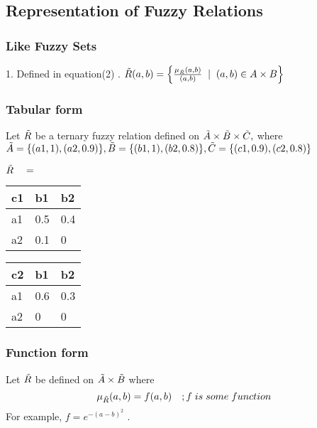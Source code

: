 \documentclass{article}
\begin{document}
\subsection{Representation of Fuzzy Relations}
\subsubsection{Like Fuzzy Sets}
1. Defined in equation(2) \newline{}. $\Tilde{R}(a,b)=\Bigl\{ \frac{\mu_{\Tilde{R}}(a,b)}{(a,b)}\hspace{0.1cm}\mid\hspace{0.1cm} (a,b)\in A\times B \Bigl\}$
\subsubsection{Tabular form}
Let $\Tilde{R}$ be a ternary fuzzy relation defined on $\Tilde{A}\times\Tilde{B}\times\Tilde{C},$ where $\Tilde{A}=\{(a1,1),(a2,0.9)\} , \Tilde{B}=\{(b1,1),(b2,0.8)\},\Tilde{C}=\{(c1,0.9),(c2,0.8)\} $
\begin{center}
$\Tilde{R}\quad = \quad$
\begin{tabular}{ | m{1cm} | m{1cm}| m{1cm} | } 
  \hline
  c1& b1 & b2 \\ 
  \hline
  a1  & 0.5 & 0.4 \\ 
  \hline
  a2 & 0.1 & 0 \\ 
  \hline
\end{tabular}
\quad
\begin{tabular}{ | m{1cm} | m{1cm}| m{1cm} | } 
  \hline
  c2& b1 & b2 \\ 
  \hline
  a1  & 0.6 & 0.3 \\ 
  \hline
  a2 & 0 & 0 \\ 
  \hline
\end{tabular}
\end{center}
\subsubsection{Function form}
Let $\Tilde{R}$ be defined on $\Tilde{A}\times\Tilde{B}$ where
\[\mu_{\Tilde{R}}(a,b)=f(a,b)\quad;f \hspace{0.1cm} is \hspace{0.1cm} some \hspace{0.1cm}function\]
For example, $f=e^{-(a-b)^2}$ .
\end{document}
